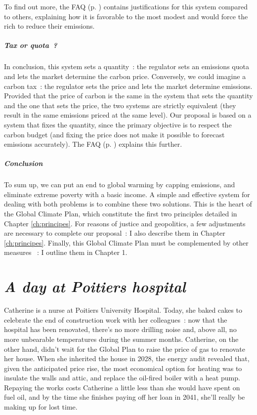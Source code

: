 \documentclass[a5paper,french,openany]{memoir}
\begin{document}
To find out more, the FAQ (p. \pageref{q:riches}) contains justifications for this system compared to others, explaining how it is favorable to the most modest and would force the rich to reduce their emissions.


\paragraph{Tax or quota~?}
In conclusion, this system sets a quantity~: the regulator sets an emissions quota and lets the market determine the carbon price. Conversely, we could imagine a carbon tax~: the regulator sets the price and lets the market determine emissions. Provided that the price of carbon is the same in the system that sets the quantity and the one that sets the price, the two systems are strictly equivalent (they result in the same emissions priced at the same level). Our proposal is based on a system that fixes the quantity, since the primary objective is to respect the carbon budget (and fixing the price does not make it possible to forecast emissions accurately). The FAQ (p. \pageref{q:taxe}) explains this further. 


\paragraph{Conclusion}
To sum up, we can put an end to global warming by capping emissions, and eliminate extreme poverty with a basic income. A simple and effective system for dealing with both problems is to combine these two solutions. This is the heart of the Global Climate Plan, %
which constitute the first two principles detailed in Chapter \ref{ch:principes}. For reasons of justice and geopolitics, a few adjustments are necessary to complete our proposal~: I also describe them in Chapter \ref{ch:principes}. %
Finally, this Global Climate Plan must be complemented by other measures%
~: I outline them in Chapter 1.


\chapter*{\textit{A day at Poitiers hospital}}\label{ch:narr_poitiers}

Catherine is a nurse at Poitiers University Hospital. Today, she baked cakes to celebrate the end of construction work with her colleagues~: now that the hospital has been renovated, there's no more drilling noise and, above all, no more unbearable temperatures during the summer months. Catherine, on the other hand, didn't wait for the Global Plan to raise the price of gas %
to renovate her house. When she inherited the house in 2028, the energy audit revealed that, given the anticipated price rise, the most economical option for heating was to insulate the walls and attic, and replace the oil-fired boiler with a heat pump. Repaying the works costs Catherine a little less than she would have spent on fuel oil, and by the time she finishes paying off her loan in 2041, she'll really be making up for lost time. 
\end{document}
